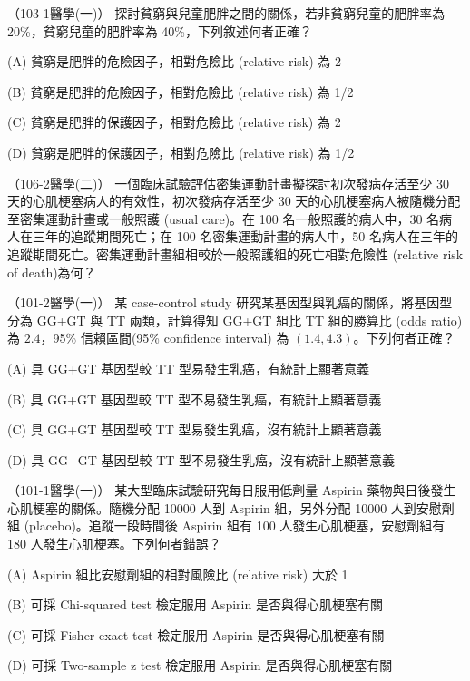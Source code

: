     \begin{docexam}{（103-1醫學(一)）}
        探討貧窮與兒童肥胖之間的關係，若非貧窮兒童的肥胖率為 20\%，貧窮兒童的肥胖率為 40\%，下列敘述何者正確？
        
        (A) 貧窮是肥胖的危險因子，相對危險比 (relative risk) 為 2
        
        (B) 貧窮是肥胖的危險因子，相對危險比 (relative risk) 為 1/2

        (C) 貧窮是肥胖的保護因子，相對危險比 (relative risk) 為 2
 
        (D) 貧窮是肥胖的保護因子，相對危險比 (relative risk) 為 1/2
    \end{docexam}
    
    \begin{docexam}{（106-2醫學(二)）}
        一個臨床試驗評估密集運動計畫擬探討初次發病存活至少 30 天的心肌梗塞病人的有效性，初次發病存活至少 30 天的心肌梗塞病人被隨機分配至密集運動計畫或一般照護 (usual care)。在 100 名一般照護的病人中，30 名病人在三年的追蹤期間死亡；在 100 名密集運動計畫的病人中，50 名病人在三年的追蹤期間死亡。密集運動計畫組相較於一般照護組的死亡相對危險性 (relative risk of death)為何？
    \end{docexam}
    
    \begin{docexam}{（101-2醫學(一)）}
        某 case-control study 研究某基因型與乳癌的關係，將基因型分為 GG+GT 與 TT 兩類，計算得知 GG+GT 組比 TT 組的勝算比 (odds ratio) 為 $2.4$，95\% 信賴區間(95\% confidence interval) 為 $(1.4, 4.3)$。下列何者正確？
        
        (A) 具 GG+GT 基因型較 TT 型易發生乳癌，有統計上顯著意義
        
        (B) 具 GG+GT 基因型較 TT 型不易發生乳癌，有統計上顯著意義

        (C) 具 GG+GT 基因型較 TT 型易發生乳癌，沒有統計上顯著意義
 
        (D) 具 GG+GT 基因型較 TT 型不易發生乳癌，沒有統計上顯著意義
    \end{docexam}
    
    \begin{docexam}{（101-1醫學(一)）}
        某大型臨床試驗研究每日服用低劑量 Aspirin 藥物與日後發生心肌梗塞的關係。隨機分配 10000 人到 Aspirin 組，另外分配 10000 人到安慰劑組 (placebo)。追蹤一段時間後 Aspirin 組有 100 人發生心肌梗塞，安慰劑組有 180 人發生心肌梗塞。下列何者錯誤？
        
        (A) Aspirin 組比安慰劑組的相對風險比 (relative risk) 大於 1
        
        (B) 可採 Chi-squared test 檢定服用 Aspirin 是否與得心肌梗塞有關

        (C) 可採 Fisher exact test 檢定服用 Aspirin 是否與得心肌梗塞有關
 
        (D) 可採 Two-sample z test 檢定服用 Aspirin 是否與得心肌梗塞有關
    \end{docexam}
    
